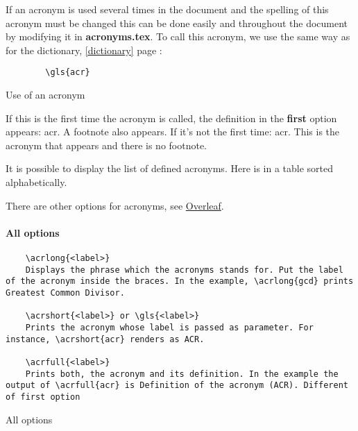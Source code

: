 If an acronym is used several times in the document and the spelling of this acronym must be changed
this can be done easily and throughout the document by modifying it in \textbf{acronyms.tex}.
To call this acronym, we use the same way as for the dictionary, \ref{dictionary} page \pageref{dictionary} :
\begin{code}
    \begin{verbatim}
        \gls{acr}
\end{verbatim}
    \caption{Use of an acronym}
\end{code}

If this is the first time the acronym is called, the definition in the \textbf{first} option appears: \gls{acr}.
A footnote also appears. \newline
If it's not the first time: \gls{acr}. This is the acronym that appears and there is no footnote. \newline

It is possible to display the list of defined acronyms. Here is in a table sorted alphabetically.

\printglossary[type=\acronymtype,style=superheaderborder]
\glsaddallunused \newline %

There are other options for acronyms, see \href{https://fr.overleaf.com/learn/latex/Glossaries}{Overleaf}.

\paragraph{All options}

\begin{code}
    \begin{verbatim}
    \acrlong{<label>}
    Displays the phrase which the acronyms stands for. Put the label of the acronym inside the braces. In the example, \acrlong{gcd} prints Greatest Common Divisor.

    \acrshort{<label>} or \gls{<label>}
    Prints the acronym whose label is passed as parameter. For instance, \acrshort{acr} renders as ACR.

    \acrfull{<label>}
    Prints both, the acronym and its definition. In the example the output of \acrfull{acr} is Definition of the acronym (ACR). Different of first option
    \end{verbatim}
    \caption{All options}
\end{code}

